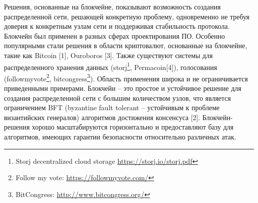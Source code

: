 \documentclass[]{itmo-student-thesis}
\begin{document}





\tableofcontents

\startprefacepage

Решения, основанные на блокчейне, показывают возможность создания
распределенной сети, решающей конкретную проблему, одновременно не
требуя доверия к конкретным узлам сети и поддерживая стабильность
протокола. Блокчейн был применен в разных сферах проектирования
ПО. Особенно популярными стали решения в области криптовалют,
основанные на блокчейне, такие как Bitcoin [1], Ouroboros [3]. Также
существуют системы для распределенного хранения данных
(storj\footnote{Storj decentralized cloud storage
  \url{https://storj.io/storj.pdf}}, Permacoin[4]), голосования
(followmyvote\footnote{Follow my vote:
  \url{https://followmyvote.com/}}, bitcongress\footnote{BitCongress:
  \url{http://www.bitcongress.org/}}). Область применения широка и не
ограничивается приведенными примерами. Блокчейн -- это простое и
устойчивое решение для создания распределенной сети с большим
количеством узлов, что является ограничением BFT (byzantine fault
tolerant -- устойчивым к проблеме византийских генералов) алгоритмов
достижения консенсуса [2]. Блокчейн-решения хорошо масштабируются
горизонтально и предоставляют базу для алгоритмов, имеющих гарантии
безопасности относительно различных атак.
\end{document}
